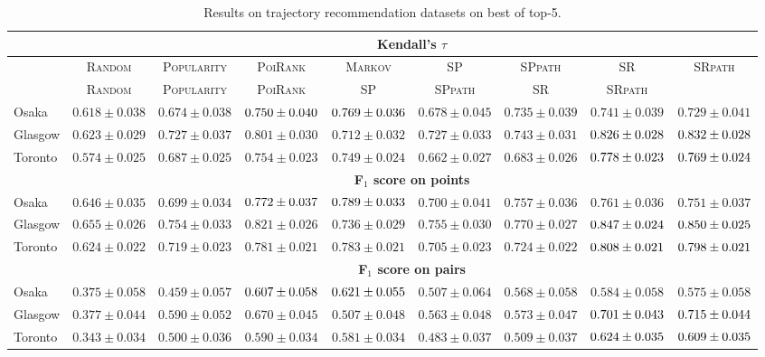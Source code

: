 \begin{table*}[!h]
\centering
\small
\setlength{\tabcolsep}{3pt} %
\begin{tabular}{l|cc|ccc|ccc} \hline
& \multicolumn{8}{c}{\bf Kendall's $\tau$} \\ \hline
 & \textsc{Random} & \textsc{Popularity} & \textsc{PoiRank} & \textsc{Markov} & \textsc{SP} & \textsc{SPpath} & \textsc{SR} & \textsc{SRpath} \\ \hline
 & \textsc{Random} & \textsc{Popularity} & \textsc{PoiRank} & \textsc{SP} & \textsc{SPpath} & \textsc{SR} & \textsc{SRpath} \\ \hline
Osaka & $0.618\pm0.038$ & $0.674\pm0.038$ & $\cellcolor{yellow!25}{0.750\pm0.040}$ & $\cellcolor{green!25}{0.769\pm0.036}$ & $0.678\pm0.045$ & $0.735\pm0.039$ & $0.741\pm0.039$ & $0.729\pm0.041$ \\
Glasgow & $0.623\pm0.029$ & $0.727\pm0.037$ & $0.801\pm0.030$ & $0.712\pm0.032$ & $0.727\pm0.033$ & $0.743\pm0.031$ & $\cellcolor{yellow!25}{0.826\pm0.028}$ & $\cellcolor{green!25}{0.832\pm0.028}$ \\
Toronto & $0.574\pm0.025$ & $0.687\pm0.025$ & $0.754\pm0.023$ & $0.749\pm0.024$ & $0.662\pm0.027$ & $0.683\pm0.026$ & $\cellcolor{green!25}{0.778\pm0.023}$ & $\cellcolor{yellow!25}{0.769\pm0.024}$ \\
\hline
& \multicolumn{8}{c}{\bf F$_1$ score on points} \\ \hline
Osaka & $0.646\pm0.035$ & $0.699\pm0.034$ & $\cellcolor{yellow!25}{0.772\pm0.037}$ & $\cellcolor{green!25}{0.789\pm0.033}$ & $0.700\pm0.041$ & $0.757\pm0.036$ & $0.761\pm0.036$ & $0.751\pm0.037$ \\
Glasgow & $0.655\pm0.026$ & $0.754\pm0.033$ & $0.821\pm0.026$ & $0.736\pm0.029$ & $0.755\pm0.030$ & $0.770\pm0.027$ & $\cellcolor{yellow!25}{0.847\pm0.024}$ & $\cellcolor{green!25}{0.850\pm0.025}$ \\
Toronto & $0.624\pm0.022$ & $0.719\pm0.023$ & $0.781\pm0.021$ & $0.783\pm0.021$ & $0.705\pm0.023$ & $0.724\pm0.022$ & $\cellcolor{green!25}{0.808\pm0.021}$ & $\cellcolor{yellow!25}{0.798\pm0.021}$ \\
\hline
& \multicolumn{8}{c}{\bf F$_1$ score on pairs} \\ \hline
Osaka & $0.375\pm0.058$ & $0.459\pm0.057$ & $\cellcolor{yellow!25}{0.607\pm0.058}$ & $\cellcolor{green!25}{0.621\pm0.055}$ & $0.507\pm0.064$ & $0.568\pm0.058$ & $0.584\pm0.058$ & $0.575\pm0.058$ \\
Glasgow & $0.377\pm0.044$ & $0.590\pm0.052$ & $0.670\pm0.045$ & $0.507\pm0.048$ & $0.563\pm0.048$ & $0.573\pm0.047$ & $\cellcolor{yellow!25}{0.701\pm0.043}$ & $\cellcolor{green!25}{0.715\pm0.044}$ \\
Toronto & $0.343\pm0.034$ & $0.500\pm0.036$ & $0.590\pm0.034$ & $0.581\pm0.034$ & $0.483\pm0.037$ & $0.509\pm0.037$ & $\cellcolor{green!25}{0.624\pm0.035}$ & $\cellcolor{yellow!25}{0.609\pm0.035}$ \\
\hline
\end{tabular}
\caption{Results on trajectory recommendation datasets on best of top-5.}
\end{table*}



